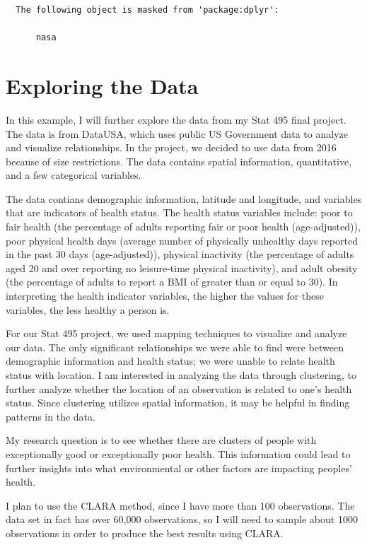 \documentclass[12pt,twoside]{amherstthesis}
\begin{document}
  \begin{verbatim}
  The following object is masked from 'package:dplyr':
  
      nasa
  \end{verbatim}
  
  \section{Exploring the Data}\label{exploring-the-data}
  
  In this example, I will further explore the data from my Stat 495 final
  project. The data is from DataUSA, which uses public US Government data
  to analyze and visualize relationships. In the project, we decided to
  use data from 2016 because of size restrictions. The data contains
  spatial information, quantitative, and a few categorical variables.
  
  The data contians demographic information, latitude and longitude, and
  variables that are indicators of health status. The health status
  variables include: poor to fair health (the percentage of adults
  reporting fair or poor health (age-adjusted)), poor physical health days
  (average number of physically unhealthy days reported in the past 30
  days (age-adjusted)), physical inactivity (the percentage of adults aged
  20 and over reporting no leisure-time physical inactivity), and adult
  obesity (the percentage of adults to report a BMI of greater than or
  equal to 30). In interpreting the health indicator variables, the higher
  the values for these variables, the less healthy a person is.
  
  For our Stat 495 project, we used mapping techniques to visualize and
  analyze our data. The only significant relationships we were able to
  find were between demographic information and health status; we were
  unable to relate health status with location. I am interested in
  analyzing the data through clustering, to further analyze whether the
  location of an observation is related to one's health status. Since
  clustering utilizes spatial information, it may be helpful in finding
  patterns in the data.
  
  My research question is to see whether there are clusters of people with
  exceptionally good or exceptionally poor health. This information could
  lead to further insights into what environmental or other factors are
  impacting peoples' health.
  
  I plan to use the CLARA method, since I have more than 100 observations.
  The data set in fact has over 60,000 observations, so I will need to
  sample about 1000 observations in order to produce the best results
  using CLARA.
  
\end{document}
